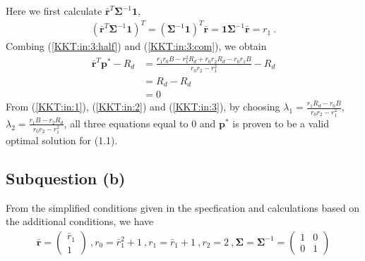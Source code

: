 \documentclass[12pt]{ftec2101}
\newcommand{\vect}[1]{\mathbf{#1}}
\begin{document}
Here we first calculate $\bar{\vect{r}}^T \boldsymbol{\Sigma}^{-1} \vect{1}$,
\begin{align}
    (\bar{\vect{r}}^T \boldsymbol{\Sigma}^{-1} \vect{1})^T = (\boldsymbol{\Sigma}^{-1} \vect{1})^T \bar{\vect{r}} = \vect{1} \boldsymbol{\Sigma}^{-1} \bar{\vect{r}} = r_1 \ .
    \label{KKT:in:3:com}
\end{align}
Combing (\ref{KKT:in:3:half}) and (\ref{KKT:in:3:com}), we obtain
\begin{align}
    \bar{\vect{r}}^T \vect{p}^{*} -R_d &= \frac{r_1 r_0 B - r_1^2 R_d + r_0 r_2 R_d - r_0 r_1 B}{r_0 r_2 - r_1^2} - R_d \\
    &= R_d - R_d \\ 
    &= 0
    \label{KKT:in:3}
\end{align}
\noindent
From (\ref{KKT:in:1}), (\ref{KKT:in:2}) and (\ref{KKT:in:3}), by choosing $\lambda_1 = \frac{r_1 R_d- r_0 B}{r_0 r_2 -r_1^2}$, $\lambda_2 = \frac{r_1 B - r_2 R_d}{r_0 r_2 -r_1^2}$, all three equations equal to $0$ and $\vect{p}^{*}$ is proven to be a valid optimal solution for (1.1).
\subsection{Subquestion (b)}
From the simplified conditions given in the specfication and calculations based on the additional conditions, we have 
\begin{align*}
    \bar{\vect{r}} =
    \begin{pmatrix}
        \bar{r}_1 \\
        1
    \end{pmatrix}\ ,
    r_0 = \bar{r}_1^2+1\ ,
    r_1 = \bar{r}_1 + 1\ , 
    r_2 = 2\ ,
    \boldsymbol{\Sigma} = \boldsymbol{\Sigma}^{-1} =
    \begin{pmatrix}
        1 & 0 \\
        0 & 1
    \end{pmatrix}
\end{align*}
\end{document}
